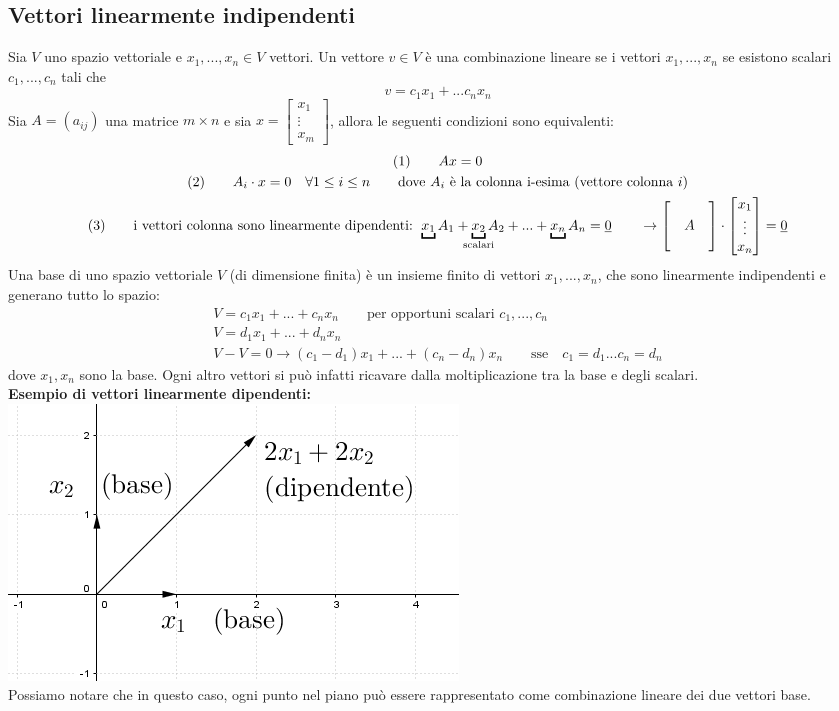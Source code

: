 \documentclass[italian]{article}
\begin{document}
\subsection{Vettori linearmente indipendenti}
Sia $V$ uno spazio vettoriale e $x_1, ..., x_n \in V$ vettori. Un vettore $v \in V$ è una combinazione lineare se i vettori $x_1, ..., x_n$ se esistono scalari $c_1, ..., c_n$ tali che
\[
	v = c_1x_1 + ... c_nx_n
\]
Sia $A=(a_{ij})$ una matrice $m \times n$ e sia $x = \begin{bmatrix}x_1 \\ \vdots \\ x_m \end{bmatrix}$, allora le seguenti condizioni sono equivalenti:
\begin{gather*}
	(1) \qquad Ax=0 \\
	(2) \qquad A_i \cdot x = 0 \quad \forall 1 \leq i \leq n \qquad \text{dove } A_i \text{ è la colonna i-esima (vettore colonna $i$)}\\
	(3) \qquad \text{i vettori colonna sono linearmente dipendenti: }
	\underbracket{x_1}A_1 + \underbracket{x_2}_{\mathclap{\text{scalari}}}A_2 + ... + \underbracket{x_n}A_n = \underline{0} \qquad \to 
	\begin{bmatrix}
		&&\\&A\\&&
	\end{bmatrix}
	\cdot
	\begin{bmatrix}
		x_1 \\ \vdots \\ x_n
	\end{bmatrix}
	= \underline{0}
\end{gather*}
Una base di uno spazio vettoriale $V$ (di dimensione finita) è un insieme finito di vettori $x_1, ..., x_n$, che sono linearmente indipendenti e generano tutto lo spazio:
\begin{gather*}
	V = c_1x_1 + ... + c_nx_n \qquad \text{per opportuni scalari $c_1, ..., c_n$}\\
	V = d_1x_1 + ... + d_nx_n \\[2mm]
	V - V = 0 \to (c_1-d_1)x_1 + ... + (c_n-d_n)x_n \qquad \text{sse}\quad c_1 = d_1 ... c_n = d_n
\end{gather*}
dove $x_1, x_n$ sono la base. Ogni altro vettori si può infatti ricavare dalla moltiplicazione tra la base e degli scalari.\\

\noindent\textbf{Esempio di vettori linearmente dipendenti:}\\
\includegraphics[width=0.4\linewidth]{img/vettori_dipendenti}\\
Possiamo notare che in questo caso, ogni punto nel piano può essere rappresentato come combinazione lineare dei due vettori base.\\
\end{document}
